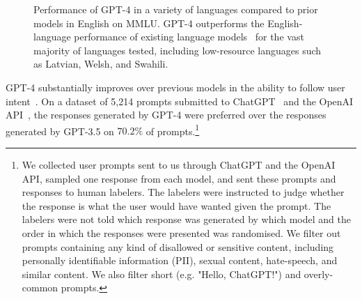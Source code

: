 \documentclass{article}
\begin{document}
\begin{figure}[htbp]
    \centering
    \caption{Performance of GPT-4 in a variety of languages compared to prior models in English on MMLU. GPT-4 outperforms the English-language performance of existing language models~\citep{hoffmann2022training,chowdhery2022palm} for the vast majority of languages tested, including low-resource languages such as Latvian, Welsh, and Swahili.}
    \label{fig:language_mmlu}
\end{figure}


GPT-4 substantially improves over previous models in the ability to follow user intent~\cite{ouyang2022training}. On a dataset of 5,214 prompts submitted to ChatGPT~\cite{openaichatgptblog} and the OpenAI API~\cite{openaiapiblog}, the responses generated by GPT-4 were preferred over the responses generated by GPT-3.5 on $70.2\%$ of prompts.\footnote{We collected user prompts sent to us through ChatGPT and the OpenAI API, sampled one response from each model, and sent these prompts and responses to human labelers. The labelers were instructed to judge whether the response is what the user would have wanted given the prompt. The labelers were not told which response was generated by which model and the order in which the responses were presented was randomised. We filter out prompts containing any kind of disallowed or sensitive content, including personally identifiable information (PII), sexual content, hate-speech, and similar content. We also filter short (e.g. "Hello, ChatGPT!") and overly-common prompts.}
\end{document}

